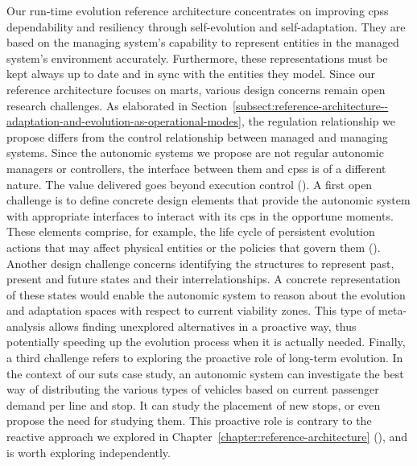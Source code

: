 Our run-time evolution reference architecture concentrates on improving \glspl{cps} dependability and resiliency through self-evolution and self-adaptation. They are based on the managing system's capability to represent entities in the managed system's environment accurately. Furthermore, these representations must be kept always up to date and in sync with the entities they model. Since our reference architecture focuses on \glspl{mart}, various design concerns remain open research challenges. As elaborated in Section~\ref{subsect:reference-architecture--adaptation-and-evolution-as-operational-modes}, the regulation relationship we propose differs from the control relationship between managed and managing systems. Since the autonomic systems we propose are not regular autonomic managers or controllers, the interface between them and \glspl{cps} is of a different nature. The value delivered goes beyond execution control (). A first open challenge is to define concrete design elements that provide the autonomic system with appropriate interfaces to interact with its \gls{cps} in the opportune moments. These elements comprise, for example, the life cycle of persistent evolution actions that may affect physical entities or the policies that govern them (). Another design challenge concerns identifying the structures to represent past, present and future states and their interrelationships. A concrete representation of these states would enable the autonomic system to reason about the evolution and adaptation spaces with respect to current viability zones. This type of meta-analysis allows finding unexplored alternatives in a proactive way, thus potentially speeding up the evolution process when it is actually needed. Finally, a third challenge refers to exploring the proactive role of long-term evolution. In the context of our \gls{suts} case study, an autonomic system can investigate the best way of distributing the various types of vehicles based on current passenger demand per line and stop. It can study the placement of new stops, or even propose the need for studying them. This proactive role is contrary to the reactive approach we explored in Chapter~\ref{chapter:reference-architecture} (), and is worth exploring independently.

